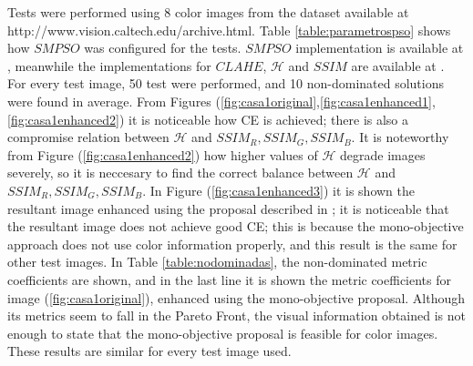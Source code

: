 Tests were performed using 8 color images from the dataset available at http://www.vision.caltech.edu/archive.html. Table \ref{table:parametrospso} shows how $SMPSO$ was configured for the tests. $SMPSO$ implementation is available at \cite{durillo2010jmetal}, meanwhile the implementations for $CLAHE$, $\mathscr{H}$ and $SSIM$ are available at \cite{bradski2000opencv}. For every test image, 50 test were performed, and 10 non-dominated solutions were found in average. From Figures (\ref{fig:casa1original},\ref{fig:casa1enhanced1},\ref{fig:casa1enhanced2}) it is noticeable how CE is achieved; there is also a compromise relation between $\mathscr{H}$ and $SSIM_R,SSIM_G,SSIM_B$. It is noteworthy from Figure (\ref{fig:casa1enhanced2}) how higher values of $\mathscr{H}$ degrade images severely, so it is neccesary to find the correct balance between $\mathscr{H}$ and $SSIM_R,SSIM_G,SSIM_B$. In Figure (\ref{fig:casa1enhanced3}) it is shown the resultant image enhanced using the proposal described in \cite{morepso}; it is noticeable that the resultant image does not achieve good CE; this is because the mono-objective approach does not use color information properly, and this result is the same for other test images. In Table \ref{table:nodominadas}, the non-dominated metric coefficients are shown, and in the last line it is shown the metric coefficients for image (\ref{fig:casa1original}), enhanced using the mono-objective proposal. Although its metrics seem to fall in the Pareto Front, the visual information obtained is not enough to state that the mono-objective proposal is feasible for color images. These results are similar for every test image used.





